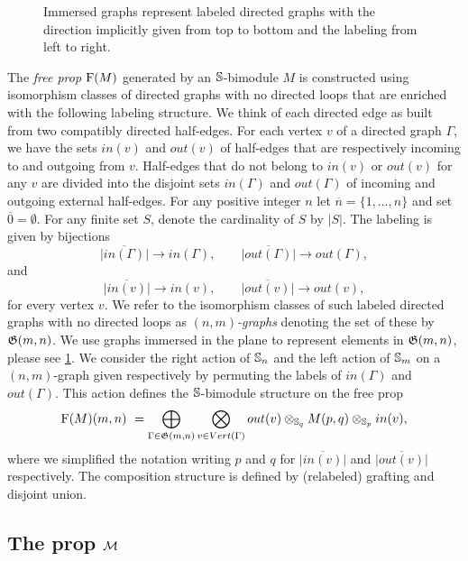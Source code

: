 \begin{figure}
	
	\caption{Immersed graphs represent labeled directed graphs with the direction implicitly given from top to bottom and the labeling from left to right.}
	\label{f:immersion}
\end{figure}

The \textit{free prop} $\free(M)$ generated by an $\S$-bimodule $M$ is constructed using isomorphism classes of directed graphs with no directed loops that are enriched with the following labeling structure.
We think of each directed edge as built from two compatibly directed half-edges.
For each vertex $v$ of a directed graph $\Gamma$, we have the sets $in(v)$ and $out(v)$ of half-edges that are respectively incoming to and outgoing from $v$.
Half-edges that do not belong to $in(v)$ or $out(v)$ for any $v$ are divided into the disjoint sets $in(\Gamma)$ and $out(\Gamma)$ of incoming and outgoing external half-edges.
For any positive integer $n$ let $\overline{n} = \{1, \dots, n\}$ and set $\overline{0} = \emptyset$.
For any finite set $S$, denote the cardinality of $S$ by $|S|$.
The labeling is given by bijections
\[
\overline{|in(\Gamma)|}\to in(\Gamma), \qquad
\overline{|out(\Gamma)|}\to out(\Gamma),
\]
and
\[
\overline{|in(v)|}\to in(v), \qquad
\overline{|out(v)|}\to out(v),
\]
for every vertex $v$.
We refer to the isomorphism classes of such labeled directed graphs with no directed loops as $(n,m)$\textit{-graphs} denoting the set of these by $\graphs(m,n)$.
We use graphs immersed in the plane to represent elements in $\graphs(m,n)$, please see \cref{f:immersion}.
We consider the right action of $\S_n$ and the left action of $\S_m$ on a $(n,m)$-graph given respectively by permuting the labels of $in(\Gamma)$ and $out(\Gamma)$.
This action defines the $\S$-bimodule structure on the free prop
\begin{equation} \label{e:free prop}
\free(M)(m,n) \ = \bigoplus_{\Gamma \in \graphs(m,n)} \bigotimes_{v \in Vert(\Gamma)} out(v) \otimes_{\S_q} M(p, q) \otimes_{\S_p} in(v),
\end{equation}
where we simplified the notation writing $p$ and $q$ for $\overline{|in(v)|}$ and $\overline{|out(v)|}$ respectively.
The composition structure is defined by (relabeled) grafting and disjoint union.

\subsection{The prop $\M$}

